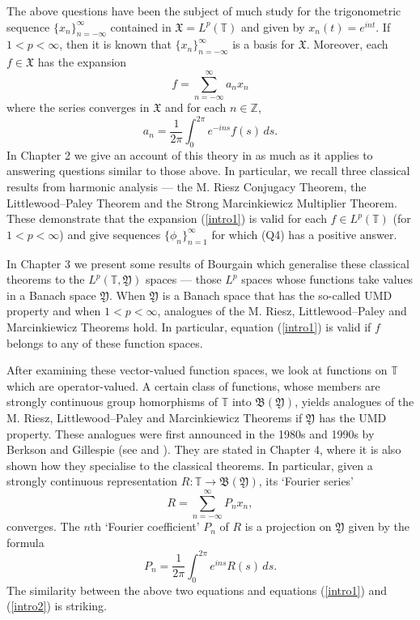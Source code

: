 \documentclass[12pt]{UNSWthesis}
\newcommand{\T}{\mathbb{T}}
\newcommand{\Z}{\mathbb{Z}}
\newcommand{\B}{\mathfrak{B}}
\newcommand{\X}{\mathfrak{X}}
\newcommand{\Y}{\mathfrak{Y}}
\numberwithin{equation}{section}
\begin{document}
The above questions have been the subject of much study for the trigonometric
sequence $\{x_n\}_{n=-\infty}^{\infty}$ contained in $\X=L^p(\T)$ and given by
$x_n(t)=e^{int}$. If $1<p<\infty$, then it is known that
$\{x_n\}_{n=-\infty}^{\infty}$ is a basis for $\X$. Moreover, each $f\in\X$ has
the expansion
\begin{equation}\label{intro1}
f=\sum_{n=-\infty}^{\infty}a_nx_n
\end{equation}
where the series converges in $\X$ and for each $n\in\Z$,
\begin{equation}\label{intro2}
a_n=\frac{1}{2\pi}\int_0^{2\pi}e^{-ins}f(s)\,ds.
\end{equation}
In Chapter 2 we give an account of this theory in as much as it applies to
answering questions similar to those above. In particular, we recall three
classical results from harmonic analysis --- the M. Riesz Conjugacy Theorem,
the Littlewood--Paley Theorem and the Strong Marcinkiewicz Multiplier Theorem.
These demonstrate that the expansion (\ref{intro1}) is valid for each 
$f\in L^p(\T)$ (for $1<p<\infty$) and give sequences
$\{\phi_n\}_{n=1}^{\infty}$ for which (Q4) has a positive answer.

In Chapter 3 we present some results of Bourgain
which generalise these classical theorems to the $L^p(\T,\Y)$ spaces
--- those $L^p$ spaces whose functions take values in a Banach space $\Y$. 
When
$\Y$ is a Banach space that has the so-called UMD property and when 
$1<p<\infty$,
analogues of the M. Riesz, Littlewood--Paley and Marcinkiewicz Theorems hold. In
particular, equation (\ref{intro1}) is valid if $f$ belongs to any of these
function spaces.

After examining these vector-valued function spaces, we look at functions on
$\T$ which are operator-valued. A certain class of functions, whose members are
strongly continuous group homorphisms of $\T$ into $\B(\Y)$, yields analogues of
the M. Riesz, Littlewood--Paley and Marcinkiewicz Theorems if
$\Y$ has the UMD property.
These analogues were first announced in the 1980s and 1990s by Berkson
and Gillespie (see \cite{BG Fourier} and \cite{BG Spectral}). They are stated
in Chapter 4, where it is also shown how they
specialise to the classical theorems. In particular, given a strongly continuous
representation $R:\T\rightarrow\B(\Y)$, its `Fourier series'
\[R=\sum_{n=-\infty}^{\infty}P_nx_n,\]
converges. The $n$th `Fourier coefficient' $P_n$ of $R$ is a projection
on $\Y$ given by the formula
\[P_n=\frac{1}{2\pi}\int_0^{2\pi}e^{ins}R(s)\,ds.\]
The similarity between the above two equations and equations (\ref{intro1}) and
(\ref{intro2}) is striking.
\end{document}
